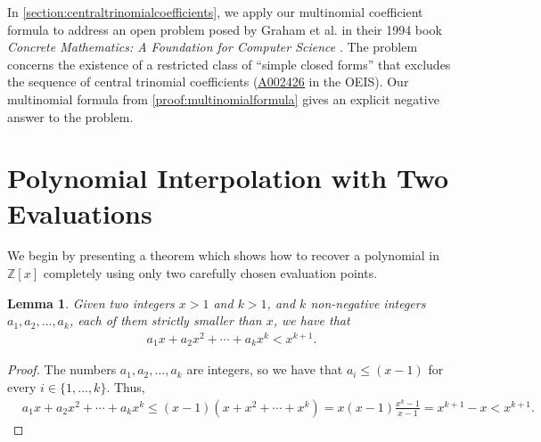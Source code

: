 \documentclass[10pt]{article}
\theoremstyle{plain}
\newtheorem{lemma}{Lemma}[section]
\newcommand{\seqnum}[1]{\href{https://oeis.org/#1}{\rm \underline{#1}}}
\begin{document}
In \cref{section:centraltrinomialcoefficients}, we apply our multinomial coefficient formula to address an open problem posed by Graham et al. in their 1994 book \textit{Concrete Mathematics: A Foundation for Computer Science} \cite{graham1994concrete}. The problem concerns the existence of a restricted class of ``simple closed forms'' that excludes the sequence of central trinomial coefficients (\seqnum{A002426} in the OEIS). Our multinomial formula from  \cref{proof:multinomialformula} gives an explicit negative answer to the problem.

\section{Polynomial Interpolation with Two Evaluations} \label{section:interpolation}
We begin by presenting a theorem which shows how to recover a polynomial in $\mathbb{Z}[x]$ completely using only two carefully chosen evaluation points.

\begin{lemma} \label{proof:encodinglemma}
Given two integers $x > 1$ and $k > 1$, and $k$ non-negative integers $a_1,a_2,\ldots,a_k$, each of them strictly smaller than $x$, we have that
\begin{align*}
a_1 x + a_2 x^2 + \cdots + a_k x^k < x^{k+1} .
\end{align*}
\end{lemma}
\begin{proof}
The numbers $a_1,a_2,\ldots,a_k$ are integers, so we have that $a_i \leq (x-1)$ for every $i \in \{ 1, \ldots, k \}$.
Thus,
\begin{align*}
& a_1 x + a_2 x^2 + \cdots + a_k x^k
\leq  (x-1) (x + x^2 + \cdots + x^k)
= x (x-1) \frac{x^k-1}{x-1} 
= x^{k+1} - x
< x^{k+1} .
\end{align*}
\end{proof}
\end{document}
